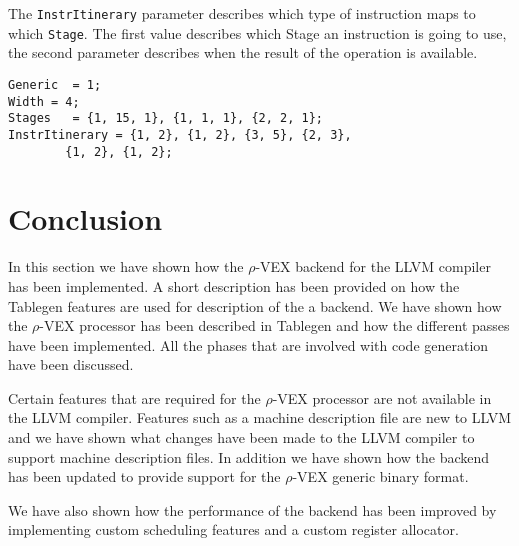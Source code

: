 The \texttt{InstrItinerary} parameter describes which type of instruction maps to which \texttt{Stage}. The first value describes which Stage an instruction is going to use, the second parameter describes when the result of the operation is available.

\begin{lstlisting}
Generic  = 1;
Width = 4; 
Stages   = {1, 15, 1}, {1, 1, 1}, {2, 2, 1};
InstrItinerary = {1, 2}, {1, 2}, {3, 5}, {2, 3}, 
        {1, 2}, {1, 2};
\end{lstlisting}



\section{Conclusion}
In this section we have shown how the $\rho$-VEX backend for the LLVM compiler has been implemented. A short description has been provided on how the Tablegen features are used for description of the a backend. We have shown how the $\rho$-VEX processor has been described in Tablegen and how the different passes have been implemented. All the phases that are involved with code generation have been discussed.

Certain features that are required for the $\rho$-VEX processor are not available in the LLVM compiler. Features such as a machine description file are new to LLVM and we have shown what changes have been made to the LLVM compiler to support machine description files. In addition we have shown how the backend has been updated to provide support for the $\rho$-VEX generic binary format.

We have also shown how the performance of the backend has been improved by implementing custom scheduling features and a custom register allocator.


\acresetall
